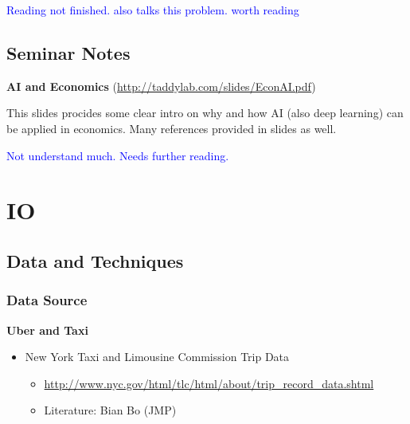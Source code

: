 \documentclass{book}
\theoremstyle{plain}
\theoremstyle{definition}
\begin{document}
\textcolor{blue}{Reading not finished.
\cite{grimmer_stewart_2013} also talks this problem. worth reading}




\section{Seminar Notes} %
\label{sec:seminar_notes}

\noindent
\textbf{AI and Economics}
(\url{http://taddylab.com/slides/EconAI.pdf})

This slides procides some clear intro on why and how AI (also deep learning) can be applied in economics.
Many references provided in slides as well.

\textcolor{blue}{Not understand much. Needs further reading.}









\chapter{IO} %
\label{cha:io}

\section{Data and Techniques} %
\label{sec:data_and_techniques}

\subsection{Data Source} %
\label{sub:data_source}

\noindent
\textbf{Uber and Taxi}
\begin{itemize}
	\item New York Taxi and Limousine Commission Trip Data
	\begin{itemize}
		\item \url{http://www.nyc.gov/html/tlc/html/about/trip_record_data.shtml}
		\item Literature: Bian Bo (JMP)
	\end{itemize}
\end{itemize}


\end{document}
